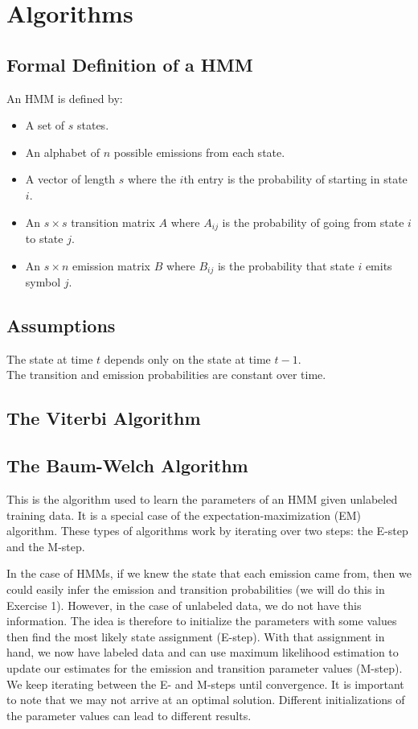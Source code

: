 \documentclass[11pt, oneside]{article}
\begin{document}
\section{Algorithms}
\subsection{Formal Definition of a HMM}
An HMM is defined by:
\begin{itemize}
\item A set of $s$ states.
\item An alphabet of $n$ possible emissions from each state.
\item A vector of length $s$ where the $i$th entry is the probability of starting in state $i$.
\item An $s\times s$ transition matrix $A$ where $A_{ij}$ is the probability of going from state $i$ to state $j$.
\item An $s \times n$ emission matrix $B$ where $B_{ij}$ is the probability that state $i$ emits symbol $j$.
\end{itemize}

\subsection{Assumptions}
The state at time $t$ depends only on the state at time $t-1$.\\
The transition and emission probabilities are constant over time.
\subsection{The Viterbi Algorithm}
\subsection{The Baum-Welch Algorithm}

This is the algorithm used to learn the parameters of an HMM given unlabeled training data. 
It is a special case of the expectation-maximization (EM) algorithm. These types of algorithms work by iterating over two steps: the E-step and the M-step.

In the case of HMMs, if we knew the state that each emission came from, then we could easily infer the emission and transition probabilities (we will do this in Exercise 1). However, in the case of unlabeled data, we do not have this information. The idea is therefore to initialize the parameters with some values then find the most likely state assignment (E-step). With that assignment in hand, we now have labeled data and can use maximum likelihood estimation to update our estimates for the emission and transition parameter values (M-step). We keep iterating between the E- and M-steps until convergence. It is important to note that we may not arrive at an optimal solution. Different initializations of the parameter values can lead to different results.
\end{document}
